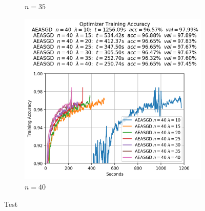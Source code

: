 \begin{figure}
\begin{subfigure}{.3\textwidth}
    \caption{$n = 35$}
  \end{subfigure}
  \begin{subfigure}{.3\textwidth}
    \centering
    \includegraphics[width=\linewidth]{resources/images/aeasgd_experiments_workers_40}
    \caption{$n = 40$}
  \end{subfigure}
  \label{fig:aeasgd_experiments_workers}
  \caption{Test}
\end{figure}

